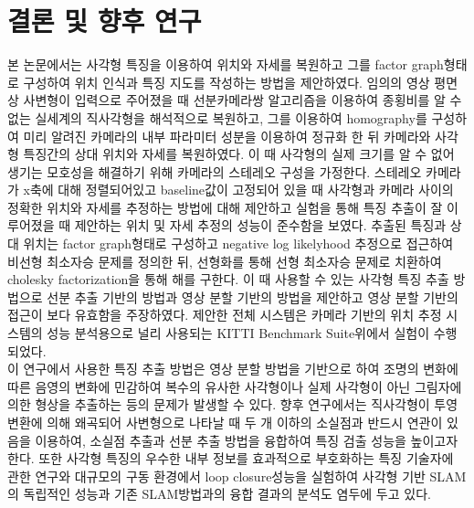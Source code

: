 \documentclass[master,korean,final]{cbnu-ecs}
\begin{document}
\chapter{결론 및 향후 연구}
본 논문에서는 사각형 특징을 이용하여 위치와 자세를 복원하고 그를 factor graph형태로 구성하여 위치 인식과 특징 지도를 작성하는 방법을 제안하였다. 임의의 영상 평면 상 사변형이 입력으로 주어졌을 때 선분카메라쌍 알고리즘을 이용하여 종횡비를 알 수 없는 실세계의 직사각형을 해석적으로 복원하고, 그를 이용하여 homography를 구성하여 미리 알려진 카메라의 내부 파라미터 성분을 이용하여 정규화 한 뒤 카메라와 사각형 특징간의 상대 위치와 자세를 복원하였다. 이 때 사각형의 실제 크기를 알 수 없어 생기는 모호성을 해결하기 위해 카메라의 스테레오 구성을 가정한다. 스테레오 카메라가 x축에 대해 정렬되어있고 baseline값이 고정되어 있을 때 사각형과 카메라 사이의 정확한 위치와 자세를 추정하는 방법에 대해 제안하고 실험을 통해 특징 추출이 잘 이루어졌을 때 제안하는 위치 및 자세 추정의 성능이 준수함을 보였다. 추출된 특징과 상대 위치는 factor graph형태로 구성하고 negative log likelyhood 추정으로 접근하여 비선형 최소자승 문제를 정의한 뒤, 선형화를 통해 선형 최소자승 문제로 치환하여 cholesky factorization을 통해 해를 구한다. 이 때 사용할 수 있는 사각형 특징 추출 방법으로 선분 추출 기반의 방법과 영상 분할 기반의 방법을 제안하고 영상 분할 기반의 접근이 보다 유효함을 주장하였다. 제안한 전체 시스템은 카메라 기반의 위치 추정 시스템의 성능 분석용으로 널리 사용되는 KITTI Benchmark Suite위에서 실험이 수행되었다.\\
이 연구에서 사용한 특징 추출 방법은 영상 분할 방법을 기반으로 하여 조명의 변화에 따른 음영의 변화에 민감하여 복수의 유사한 사각형이나 실제 사각형이 아닌 그림자에 의한 형상을 추출하는 등의 문제가 발생할 수 있다. 향후 연구에서는 직사각형이 투영변환에 의해 왜곡되어 사변형으로 나타날 때 두 개 이하의 소실점과 반드시 연관이 있음을 이용하여, 소실점 추출과 선분 추출 방법을 융합하여 특징 검출 성능을 높이고자 한다. 또한 사각형 특징의 우수한 내부 정보를 효과적으로 부호화하는 특징 기술자에 관한 연구와 대규모의 구동 환경에서 loop closure성능을 실험하여 사각형 기반 SLAM의 독립적인 성능과 기존 SLAM방법과의 융합 결과의 분석도 염두에 두고 있다.

%
%
%
\end{document}
